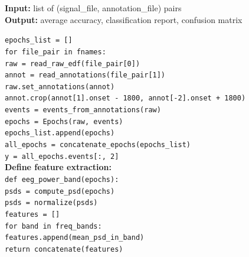 	
	\begin{algorithm}
		\textbf{Input:} list of (signal\_file, annotation\_file) pairs \\
		\textbf{Output:} average accuracy, classification report, confusion matrix
		
		\vspace{0.3cm}
		\texttt{epochs\_list = []} \\
		\texttt{for file\_pair in fnames:} \\
		\hspace*{0.5cm}\texttt{raw = read\_raw\_edf(file\_pair[0])} \\
		\hspace*{0.5cm}\texttt{annot = read\_annotations(file\_pair[1])} \\
		\hspace*{0.5cm}\texttt{raw.set\_annotations(annot)} \\
		\hspace*{0.5cm}\texttt{annot.crop(annot[1].onset - 1800, annot[-2].onset + 1800)} \\
		\hspace*{0.5cm}\texttt{events = events\_from\_annotations(raw)} \\
		\hspace*{0.5cm}\texttt{epochs = Epochs(raw, events)} \\
		\hspace*{0.5cm}\texttt{epochs\_list.append(epochs)} \\
		
		\vspace{0.3cm}
		\texttt{all\_epochs = concatenate\_epochs(epochs\_list)} \\
		\texttt{y = all\_epochs.events[:, 2]} \\
		
		\vspace{0.3cm}
		\textbf{Define feature extraction:} \\
		\texttt{def eeg\_power\_band(epochs):} \\
		\hspace*{0.5cm}\texttt{psds = compute\_psd(epochs)} \\
		\hspace*{0.5cm}\texttt{psds = normalize(psds)} \\
		\hspace*{0.5cm}\texttt{features = []} \\
		\hspace*{0.5cm}\texttt{for band in freq\_bands:} \\
		\hspace*{1cm}\texttt{features.append(mean\_psd\_in\_band)} \\
		\hspace*{0.5cm}\texttt{return concatenate(features)} \\
		

\end{algorithm}
